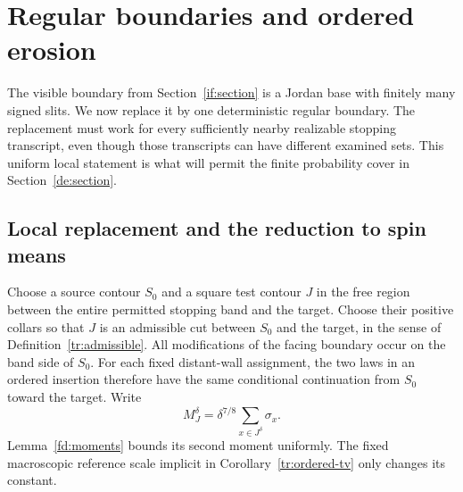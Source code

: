 \documentclass[11pt]{article}
\theoremstyle{definition}
\theoremstyle{remark}
\numberwithin{equation}{section}
\begin{document}
\section{Regular boundaries and ordered erosion}\label{rg:section}

The visible boundary from Section~\ref{if:section} is a Jordan base
with finitely many signed slits. We now replace it by one deterministic
regular boundary. The replacement must work for every sufficiently
nearby realizable stopping transcript, even though those transcripts
can have different examined sets. This uniform local statement is what
will permit the finite probability cover in Section~\ref{de:section}.

\subsection{Local replacement and the reduction to spin means}

Choose a source contour $S_0$ and a square test contour $J$ in the free
region between the entire permitted stopping band and the target.
Choose their positive collars so that $J$ is an admissible cut between
$S_0$ and the target, in the sense of Definition~\ref{tr:admissible}.
All modifications of the facing boundary occur on the band side of
$S_0$. For each fixed distant-wall assignment, the two laws in an
ordered insertion therefore have the same conditional continuation
from $S_0$ toward the target. Write
\begin{equation}\label{if:line-mean}
                 M_J^\delta=\delta^{7/8}\sum_{x\in J^\delta}\sigma_x.
\end{equation}
Lemma~\ref{fd:moments} bounds its second moment uniformly. The fixed
macroscopic reference scale implicit in Corollary~\ref{tr:ordered-tv}
only changes its constant.
\end{document}
